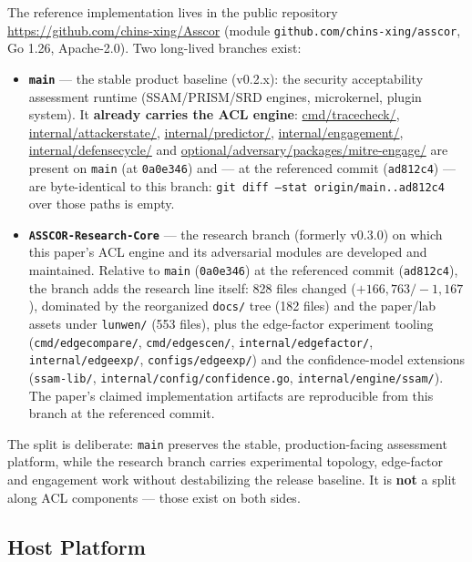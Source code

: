 \documentclass[11pt]{article}
\begin{document}
The reference implementation lives in the public repository
\url{https://github.com/chins-xing/Asscor} (module
\texttt{github.com/chins-xing/asscor}, Go 1.26, Apache-2.0). Two long-lived
branches exist:
\begin{itemize}
\item \textbf{\texttt{main}} --- the stable product baseline (v0.2.x): the
      security acceptability assessment runtime (SSAM/PRISM/SRD engines,
      microkernel, plugin system). It \textbf{already carries the ACL
      engine}: \url{cmd/tracecheck/},
      \url{internal/attackerstate/}, \url{internal/predictor/},
      \url{internal/engagement/}, \url{internal/defensecycle/}
      and \url{optional/adversary/packages/mitre-engage/} are present on
      \texttt{main} (at \texttt{0a0e346}) and --- at the referenced commit
      (\texttt{ad812c4}) --- are byte-identical to this branch:
      \texttt{git diff --stat origin/main..ad812c4} over those paths is
      empty.
\item \textbf{\texttt{ASSCOR-Research-Core}} --- the research branch
      (formerly v0.3.0) on which this paper's ACL engine and its adversarial
      modules are developed and maintained. Relative to \texttt{main}
      (\texttt{0a0e346}) at the referenced commit (\texttt{ad812c4}), the
      branch adds the research line itself: 828 files changed
      ($+166{,}763/-1{,}167$), dominated by the reorganized \texttt{docs/}
      tree (182 files) and the paper/lab assets under \texttt{lunwen/} (553
      files), plus the edge-factor experiment tooling
      (\texttt{cmd/edgecompare/}, \texttt{cmd/edgescen/},
      \texttt{internal/edgefactor/}, \texttt{internal/edgeexp/},
      \texttt{configs/edgeexp/}) and the confidence-model extensions
      (\texttt{ssam-lib/}, \texttt{internal/config/confidence.go},
      \texttt{internal/engine/ssam/}). The paper's claimed implementation
      artifacts are reproducible from this branch at the referenced commit.
\end{itemize}
The split is deliberate: \texttt{main} preserves the stable, production-facing
assessment platform, while the research branch carries experimental topology,
edge-factor and engagement work without destabilizing the release baseline. It
is \textbf{not} a split along ACL components --- those exist on both sides.

\subsection{Host Platform}
\end{document}
